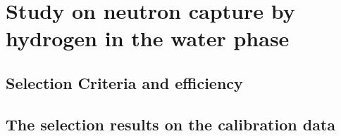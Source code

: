 \section{Study on neutron capture by hydrogen in the water phase}
\subsection{Selection Criteria and efficiency}
\subsection{The selection results on the   calibration data}